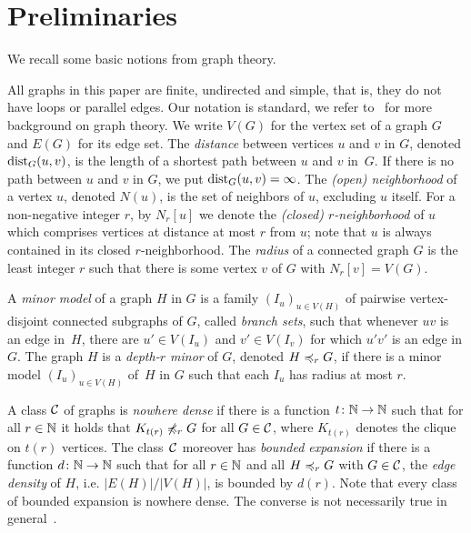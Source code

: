 \section{Preliminaries}\label{sec:prelim}
We  recall some basic notions from graph theory. 

\medskip
All graphs in this paper are finite, undirected and simple, that is, 
they do not have loops or parallel edges. Our notation is standard,
we refer to~\cite{diestel2012graph} for more background on 
graph theory. 
We write $V(G)$ for the vertex set of a graph $G$ and
$E(G)$ for its edge set. 
The {\em{distance}} between vertices $u$ and $v$ in $G$, denoted $\mathrm{dist}_G(u,v)$, is the length of a shortest path between $u$ and $v$ in~$G$.
If there is no path between $u$ and $v$ in $G$, we put $\mathrm{dist}_G(u,v)=\infty$.
The {\em{(open) neighborhood}} of a vertex $u$, denoted $N(u)$, is the set of neighbors of $u$, excluding $u$ itself.
For a non-negative integer $r$, by $N_r[u]$ we denote the {\em{(closed) $r$-neighborhood}} of $u$ which comprises vertices at distance at most $r$ from $u$; 
note that $u$ is always contained in its closed $r$-neighborhood. The \emph{radius} of a connected graph $G$ is the least integer $r$ such that there is some vertex $v$ of $G$ with $N_r[v]=V(G)$.


A {\em{minor model}} of a graph $H$ in $G$ is a family $(I_u)_{u\in V(H)}$ of pairwise vertex-disjoint connected subgraphs of $G$, called {\em{branch sets}},
such that whenever $uv$ is an edge in~$H$, there are $u'\in V(I_u)$ and $v'\in V(I_v)$ for which $u'v'$ 
is an edge in $G$.
The graph $H$ is a {\em{depth-$r$ minor}} of $G$, denoted $H\preccurlyeq_rG$, if there is a minor model
$(I_u)_{u\in V(H)}$ of~$H$ in $G$ such that each $I_u$ has radius at most $r$.

A class $\mathcal{C}$ of graphs is \emph{nowhere dense} if there is a function 
$t\colon \mathbb{N}\rightarrow \mathbb{N}$ such that for all $r\in \mathbb{N}$ it holds that $K_{t(r)}\not\preccurlyeq_r G$
for all $G\in \mathcal{C}$, where $K_{t(r)}$ denotes the clique on $t(r)$ vertices.
The class~$\mathcal{C}$ moreover has \emph{bounded expansion}
if there is a function $d\colon\mathbb{N}\rightarrow\mathbb{N}$ such that for all 
$r\in \mathbb{N}$ and all $H\preccurlyeq_rG$ with $G\in\mathcal{C}$, the {\em{edge density}}
of $H$, i.e. $|E(H)|/|V(H)|$, is bounded by $d(r)$. Note that every 
class of bounded expansion is nowhere dense. The converse is not necessarily true in general~\cite{sparsity}.


